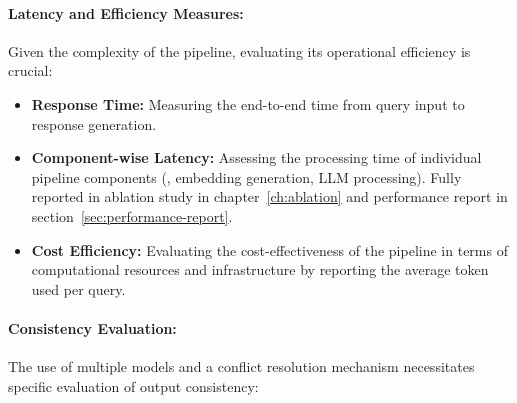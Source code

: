 \paragraph{Latency and Efficiency Measures:}
Given the complexity of the pipeline, evaluating its operational efficiency is crucial:
\begin{itemize}
    \item \textbf{Response Time:} Measuring the end-to-end time from query input to response generation.
    \item \textbf{Component-wise Latency:} Assessing the processing time of individual pipeline components (\eg, embedding generation, LLM processing). Fully reported in ablation study in chapter~\ref{ch:ablation} and performance report in section~\ref{sec:performance-report}.
    \item \textbf{Cost Efficiency:} Evaluating the cost-effectiveness of the pipeline in terms of computational resources and infrastructure by reporting the average token used per query.
\end{itemize}

\paragraph{Consistency Evaluation:}
The use of multiple models and a conflict resolution mechanism necessitates specific evaluation of output consistency:

